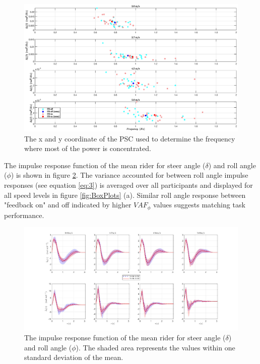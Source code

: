 \begin{figure}[htbp]
\centering
\includegraphics [width=1\textwidth]{images/PSC3.eps}
\caption{The x and y coordinate of the PSC used to determine the frequency where most of the power is concentrated.}
\label{fig:pscentroid}
\end{figure}

The impulse response function of the mean rider for steer angle (\(\delta\)) and roll angle (\(\phi\)) is shown in figure \ref{fig:irf}. The variance accounted for between roll angle impulse responses (see equation \ref{eq:3}) is averaged over all participants and displayed for all speed levels in figure \ref{fig:BoxPlots} (a). Similar roll angle response between "feedback on" and off indicated by higher \(\mathit{VAF}_\phi\) values suggests matching task performance.

\begin{figure}[htbp]
\centering
\includegraphics [width=1\textwidth]{images/meanIRF.jpg}
\caption{The impulse response function of the mean rider for steer angle (\(\delta\)) and roll angle (\(\phi\)). The shaded area represents the values within one standard deviation of the mean.}
\label{fig:irf}
\end{figure}

